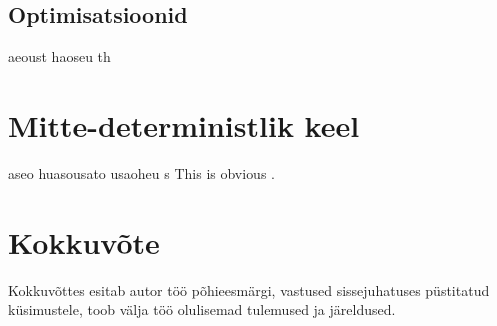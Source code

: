 \documentclass[a4paper,12pt]{article}
\begin{document}
\subsection{Optimisatsioonid}
aeoust haoseu th

\clearpage

\section{Mitte-deterministlik keel}
aseo huasousato usaoheu s
This is obvious \cite{Benton2016}. \cite{Katsumata2014}

\clearpage

\section{Kokkuvõte}
Kokkuvõttes esitab autor töö põhieesmärgi, vastused sissejuhatuses püstitatud
küsimustele, toob välja töö olulisemad tulemused ja järeldused.

\clearpage

\renewcommand{\baselinestretch}{1.15}
\fontsize{11}{11}\selectfont
\printbibliography[title={\vskip 60pt\centering Kasutatud kirjandus}]
\end{document}
